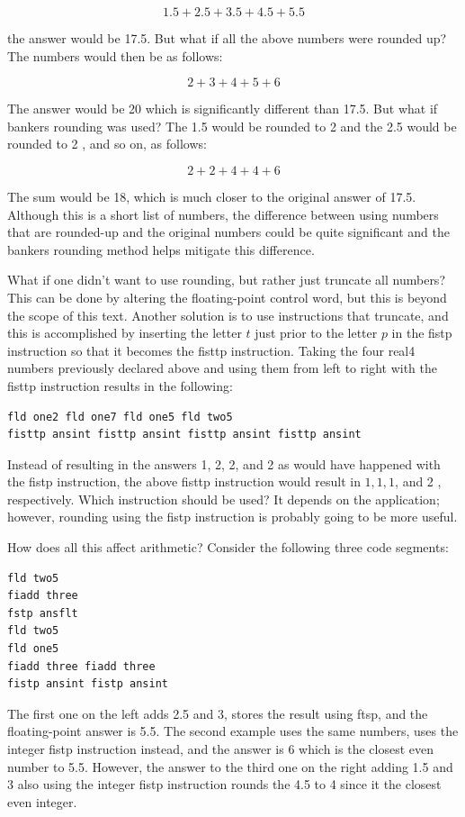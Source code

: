 \documentclass[10pt]{article}
\begin{document}
$$
1.5+2.5+3.5+4.5+5.5
$$

the answer would be 17.5. But what if all the above numbers were rounded up? The numbers would then be as follows:

$$
2+3+4+5+6
$$

The answer would be 20 which is significantly different than 17.5. But what if bankers rounding was used? The 1.5 would be rounded to 2 and the 2.5 would be rounded to 2 , and so on, as follows:

$$
2+2+4+4+6
$$

The sum would be 18, which is much closer to the original answer of 17.5. Although this is a short list of numbers, the difference between using numbers that are rounded-up and the original numbers could be quite significant and the bankers rounding method helps mitigate this difference.

What if one didn't want to use rounding, but rather just truncate all numbers? This can be done by altering the floating-point control word, but this is beyond the scope of this text. Another solution is to use instructions that truncate, and this is accomplished by inserting the letter $t$ just prior to the letter $p$ in the fistp instruction so that it becomes the fisttp instruction. Taking the four real4 numbers previously declared above and using them from left to right with the fisttp instruction results in the following:

\begin{verbatim}
fld one2 fld one7 fld one5 fld two5
fisttp ansint fisttp ansint fisttp ansint fisttp ansint
\end{verbatim}

Instead of resulting in the answers 1, 2, 2, and 2 as would have happened with the fistp instruction, the above fisttp instruction would result in $1,1,1$, and 2 , respectively. Which instruction should be used? It depends on the application; however, rounding using the fistp instruction is probably going to be more useful.

How does all this affect arithmetic? Consider the following three code segments:

\begin{verbatim}
fld two5
fiadd three
fstp ansflt
fld two5
fld one5
fiadd three fiadd three
fistp ansint fistp ansint
\end{verbatim}

The first one on the left adds 2.5 and 3, stores the result using ftsp, and the floating-point answer is 5.5. The second example uses the same numbers, uses the integer fistp instruction instead, and the answer is 6 which is the closest even number to 5.5. However, the answer to the third one on the right adding 1.5 and 3 also using the integer fistp instruction rounds the 4.5 to 4 since it the closest even integer.
\end{document}
